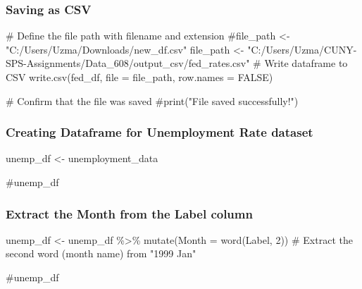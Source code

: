 \documentclass[
  letterpaper,
  DIV=11,
  numbers=noendperiod]{scrartcl}
\newenvironment{Shaded}{\begin{snugshade}}{\end{snugshade}}
\newcommand{\AttributeTok}[1]{\textcolor[rgb]{0.40,0.45,0.13}{#1}}
\newcommand{\CommentTok}[1]{\textcolor[rgb]{0.37,0.37,0.37}{#1}}
\newcommand{\ConstantTok}[1]{\textcolor[rgb]{0.56,0.35,0.01}{#1}}
\newcommand{\DecValTok}[1]{\textcolor[rgb]{0.68,0.00,0.00}{#1}}
\newcommand{\FunctionTok}[1]{\textcolor[rgb]{0.28,0.35,0.67}{#1}}
\newcommand{\NormalTok}[1]{\textcolor[rgb]{0.00,0.23,0.31}{#1}}
\newcommand{\OtherTok}[1]{\textcolor[rgb]{0.00,0.23,0.31}{#1}}
\newcommand{\SpecialCharTok}[1]{\textcolor[rgb]{0.37,0.37,0.37}{#1}}
\newcommand{\StringTok}[1]{\textcolor[rgb]{0.13,0.47,0.30}{#1}}
\begin{document}
\subsubsection{Saving as CSV}\label{saving-as-csv-2}

\begin{Shaded}
\begin{Highlighting}[]
\CommentTok{\# Define the file path with filename and extension}
\CommentTok{\#file\_path \textless{}{-} "C:/Users/Uzma/Downloads/new\_df.csv"}
\NormalTok{file\_path }\OtherTok{\textless{}{-}} \StringTok{"C:/Users/Uzma/CUNY{-}SPS{-}Assignments/Data\_608/output\_csv/fed\_rates.csv"}
\CommentTok{\# Write dataframe to CSV}
\FunctionTok{write.csv}\NormalTok{(fed\_df, }\AttributeTok{file =}\NormalTok{ file\_path, }\AttributeTok{row.names =} \ConstantTok{FALSE}\NormalTok{)}

\CommentTok{\# Confirm that the file was saved}
\CommentTok{\#print("File saved successfully!")}
\end{Highlighting}
\end{Shaded}

\subsubsection{Creating Dataframe for Unemployment Rate
dataset}\label{creating-dataframe-for-unemployment-rate-dataset}

\begin{Shaded}
\begin{Highlighting}[]
\NormalTok{unemp\_df }\OtherTok{\textless{}{-}}\NormalTok{ unemployment\_data}

\CommentTok{\#unemp\_df}
\end{Highlighting}
\end{Shaded}

\subsubsection{Extract the Month from the Label
column}\label{extract-the-month-from-the-label-column}

\begin{Shaded}
\begin{Highlighting}[]
\NormalTok{unemp\_df }\OtherTok{\textless{}{-}}\NormalTok{ unemp\_df }\SpecialCharTok{\%\textgreater{}\%}
  \FunctionTok{mutate}\NormalTok{(}\AttributeTok{Month =} \FunctionTok{word}\NormalTok{(Label, }\DecValTok{2}\NormalTok{))  }\CommentTok{\# Extract the second word (month name) from "1999 Jan"}

\CommentTok{\#unemp\_df}
\end{Highlighting}
\end{Shaded}
\end{document}
